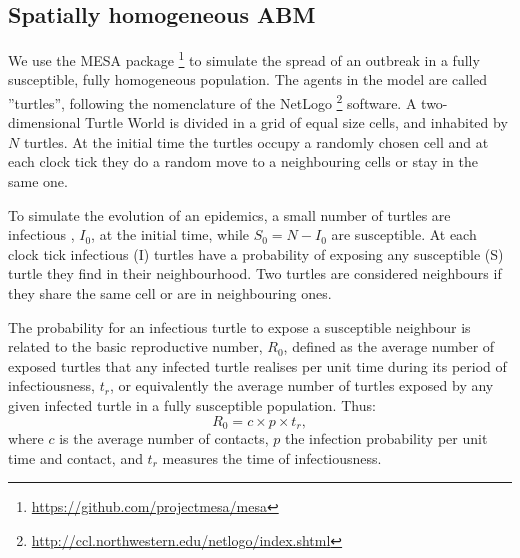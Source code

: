 \documentclass[a4paper,oneside,11pt]{article}
\begin{document}
\subsection{Spatially homogeneous ABM}

We use the MESA package \footnote{\url{https://github.com/projectmesa/mesa}} to simulate the spread of an outbreak in a fully susceptible, fully homogeneous population. The agents in the model are called ''turtles'', following the nomenclature of the NetLogo \footnote{\url{http://ccl.northwestern.edu/netlogo/index.shtml}} software. 
A two-dimensional Turtle World is divided in a grid of equal size cells, and inhabited by $N$ turtles. At the initial time the turtles occupy a randomly chosen cell and  at each clock tick they do a random move to a neighbouring cells or stay in the same one. 

To simulate the evolution of an epidemics, a small number of turtles are infectious , $I_0$, at the initial time, while $S_0 = N-I_0$ are susceptible. At each clock tick infectious (I) turtles have a probability of exposing any susceptible (S) turtle they find in their neighbourhood. Two turtles are considered neighbours if they share the same cell or are in  neighbouring ones. 

The probability for an infectious turtle to expose a susceptible neighbour is related to the basic reproductive number, $R_0$,  defined as the average number of exposed turtles that any infected turtle realises per unit time during its period of infectiousness, $t_r$, or equivalently
the average number of turtles exposed by any given infected turtle in a fully susceptible population. Thus:
\begin{equation}
R_0 = c \times p \times t_r,
\label{eq:r0cptr}
\end{equation}
where $c$ is the average number of contacts, $p$ the infection probability per unit time and contact, and $t_r$ measures the time of infectiousness. 
\end{document}

